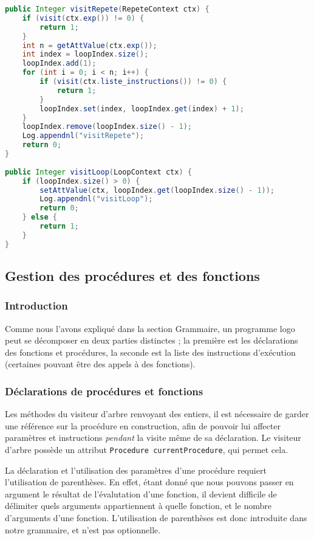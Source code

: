 \documentclass[a4paper,11pt]{article}
\begin{document}
\begin{lstlisting}[language=Java]
public Integer visitRepete(RepeteContext ctx) {
    if (visit(ctx.exp()) != 0) {
        return 1;
    }
    int n = getAttValue(ctx.exp());
    int index = loopIndex.size();
    loopIndex.add(1);
    for (int i = 0; i < n; i++) {
        if (visit(ctx.liste_instructions()) != 0) {
            return 1;
        }
        loopIndex.set(index, loopIndex.get(index) + 1);
    }
    loopIndex.remove(loopIndex.size() - 1);
    Log.appendnl("visitRepete");
    return 0;
}
    
public Integer visitLoop(LoopContext ctx) {
    if (loopIndex.size() > 0) {
        setAttValue(ctx, loopIndex.get(loopIndex.size() - 1));
        Log.appendnl("visitLoop");
        return 0;
    } else {
        return 1;
    }
}
\end{lstlisting}

\subsection{Gestion des procédures et des fonctions}
\subsubsection{Introduction}
Comme nous l'avons expliqué dans la section Grammaire, un programme logo peut se décomposer en deux parties distinctes ; la première est les déclarations des fonctions et procédures, la seconde est la liste des instructions d'exécution (certaines pouvant être des appels à des fonctions).

\subsubsection{Déclarations de procédures et fonctions}
Les méthodes du visiteur d'arbre renvoyant des entiers, il est nécessaire de garder une référence sur la procédure en construction, afin de pouvoir lui affecter paramètres et instructions \textit{pendant} la visite même de sa déclaration. Le visiteur d'arbre possède un attribut \lstinline$Procedure currentProcedure$, qui permet cela.

La déclaration et l'utilisation des paramètres d'une procédure requiert l'utilisation de parenthèses. En effet, étant donné que nous pouvons passer en argument le résultat de l'évalutation d'une fonction, il devient difficile de délimiter quels arguments appartiennent à quelle fonction, et le nombre d'arguments d'une fonction. L'utilisation de parenthèses est donc introduite dans notre grammaire, et n'est pas optionnelle.
\end{document}
